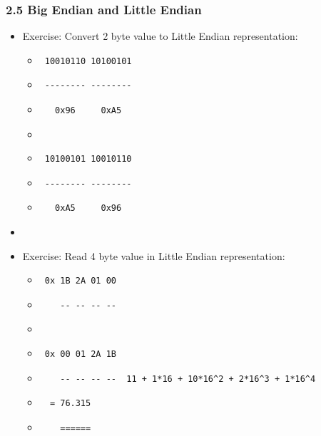 \begin{frame}[fragile]
  \frametitle{2.5 Big Endian and Little Endian}
    \begin{itemize}
        \item[] Exercise: Convert 2 byte value to Little Endian representation:
            \begin{itemize}
                \item[] \begin{verbatim} 10010110 10100101 \end{verbatim}
                \item[] \begin{verbatim} -------- -------- \end{verbatim}
                \item[] \begin{verbatim}   0x96     0xA5   \end{verbatim}
                \item[] 
                \item[] \begin{verbatim} 10100101 10010110 \end{verbatim}
                \item[] \begin{verbatim} -------- -------- \end{verbatim}
                \item[] \begin{verbatim}   0xA5     0x96   \end{verbatim}
            \end{itemize}
        \item[] 
        \item[] Exercise: Read 4 byte value in Little Endian representation:
            \begin{itemize}
                \item[] \begin{verbatim} 0x 1B 2A 01 00\end{verbatim}
                \item[] \begin{verbatim}    -- -- -- --\end{verbatim}
                \item[] 
                \item[] \begin{verbatim} 0x 00 01 2A 1B\end{verbatim}
                \item[] \begin{verbatim}    -- -- -- --  11 + 1*16 + 10*16^2 + 2*16^3 + 1*16^4\end{verbatim}
                \item[] \begin{verbatim}  = 76.315  \end{verbatim}
                \item[] \begin{verbatim}    ======  \end{verbatim}
            \end{itemize}
    \end{itemize}
\end{frame}


